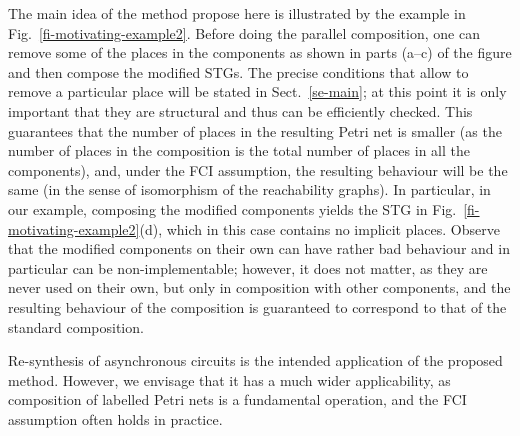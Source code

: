 The main idea of the method propose here is illustrated by the example in Fig.~\ref{fi-motivating-example2}. Before doing the parallel composition, one can remove some of the places in the components as shown in parts (a--c) of the figure and then compose the modified STGs. The precise conditions that allow to remove a particular place will be stated in Sect.~\ref{se-main}; at this point it is only important that they are structural and thus can be efficiently checked. This guarantees that the number of places in the resulting Petri net is smaller (as the number of places in the composition is the total number of places in all the components), and, under the FCI assumption, the resulting behaviour will be the same (in the sense of isomorphism of the reachability graphs). In particular, in our example, composing the modified components yields the STG in Fig.~\ref{fi-motivating-example2}(d), which in this case contains no implicit places. Observe that the modified components on their own can have rather bad behaviour and in particular can be non-implementable; however, it does not matter, as they are never used on their own, but only in composition with other components, and the resulting behaviour of the composition is guaranteed to correspond to that of the standard composition.

Re-synthesis of asynchronous circuits is the intended application of the proposed method. However, we envisage that it has a much wider applicability, as composition of labelled Petri nets is a fundamental operation, and the FCI assumption often holds in practice.
